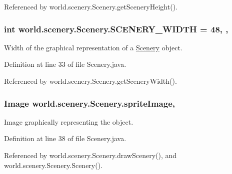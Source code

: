 Referenced by world.\-scenery.\-Scenery.\-get\-Scenery\-Height().

\hypertarget{classworld_1_1scenery_1_1_scenery_affb047c028883c6d069a03ef0f1caeb8}{
\subsubsection[{S\-C\-E\-N\-E\-R\-Y\-\_\-\-W\-I\-D\-T\-H}]{\setlength{\rightskip}{0pt plus 5cm}int world.\-scenery.\-Scenery.\-S\-C\-E\-N\-E\-R\-Y\-\_\-\-W\-I\-D\-T\-H = 48\hspace{0.3cm}{\ttfamily [static]}, {\ttfamily [protected]}, {\ttfamily [inherited]}}}\label{classworld_1_1scenery_1_1_scenery_affb047c028883c6d069a03ef0f1caeb8}


Width of the graphical representation of a \hyperlink{classworld_1_1scenery_1_1_scenery}{Scenery} object. 



Definition at line 33 of file Scenery.\-java.



Referenced by world.\-scenery.\-Scenery.\-get\-Scenery\-Width().

\hypertarget{classworld_1_1scenery_1_1_scenery_a512d9c0a154e6843389e343d80843326}{
\subsubsection[{sprite\-Image}]{\setlength{\rightskip}{0pt plus 5cm}Image world.\-scenery.\-Scenery.\-sprite\-Image\hspace{0.3cm}{\ttfamily [protected]}, {\ttfamily [inherited]}}}\label{classworld_1_1scenery_1_1_scenery_a512d9c0a154e6843389e343d80843326}


Image graphically representing the object. 



Definition at line 38 of file Scenery.\-java.



Referenced by world.\-scenery.\-Scenery.\-draw\-Scenery(), and world.\-scenery.\-Scenery.\-Scenery().

